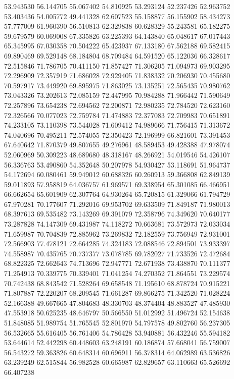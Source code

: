 53.943530
56.144705
55.067402
54.810925
53.293124
52.237426
52.963752
53.403436
54.005772
49.441328
62.607523
55.158877
56.155902
58.434273
57.777009
61.960390
56.510813
62.329838
60.628329
55.243581
65.182275
59.679579
60.069008
67.335826
63.225393
64.143840
65.048617
67.017443
65.345995
67.030358
70.504222
65.423937
67.133180
67.562188
69.582415
69.890469
69.529148
68.184804
68.709484
64.591520
65.122036
66.328617
72.515846
71.786705
70.411150
71.857427
71.306205
71.094973
69.903295
72.296909
72.357919
71.686028
72.929405
71.838332
70.206930
70.455680
70.597917
73.449920
69.895975
71.863025
73.135251
72.565435
70.980762
73.043326
73.202613
72.085159
72.447995
70.984288
71.966442
71.590649
72.257896
73.654238
72.694562
72.200871
72.980235
72.784520
72.623160
72.326566
70.077023
72.759784
71.474883
72.377083
72.709983
70.651891
74.233105
73.110398
73.544028
71.609412
74.989666
71.756415
71.313672
74.040696
70.495211
72.574055
72.350423
72.196999
66.821601
73.391453
67.640642
71.870379
49.807655
49.276961
48.589453
49.428388
47.978074
52.060969
50.309223
48.689680
48.318167
48.266921
54.019546
54.426107
56.336763
53.490860
54.352648
50.207978
54.930427
53.118691
51.964737
54.172694
60.080461
59.949012
60.688326
60.260913
59.366808
62.849139
59.011893
57.958819
64.036757
61.969571
69.338954
65.301085
66.466951
66.662654
65.601909
62.307764
64.930264
65.720815
61.329066
61.794729
67.970281
70.177607
71.292016
69.953702
69.633509
71.849187
71.980013
68.397613
69.535482
73.143269
69.391079
72.358796
74.349620
70.640177
73.287828
74.147309
69.431987
74.118272
70.663681
73.572973
72.033034
71.659987
70.704839
72.885962
73.269832
72.182559
73.756949
72.931001
72.566903
77.478121
72.664285
74.324183
72.088546
72.894501
73.933397
74.558987
70.435765
70.737377
73.078785
69.782027
71.733526
72.472684
68.822325
72.662643
74.713696
72.947771
72.671938
73.438870
70.111377
71.254913
70.339775
70.339401
71.041254
74.270352
71.864551
73.229574
70.742438
68.843542
71.528264
69.658548
71.195610
68.878724
70.915221
71.807887
72.220207
68.209545
71.661287
69.866275
71.342520
71.028224
52.166388
49.667665
47.804683
48.330703
48.374404
48.883527
47.485930
47.553918
50.625235
48.646797
50.566550
51.012992
51.496724
52.154638
51.848085
51.989754
51.765545
52.801970
54.797578
49.802760
56.237305
56.532665
55.616405
56.761406
54.786428
53.940881
56.432246
55.594182
53.644614
52.442298
60.448603
63.248191
60.186874
57.668041
56.759007
56.543272
59.363826
60.648314
60.696911
56.378314
64.062989
63.536826
63.239249
62.515844
56.982528
60.665987
62.829657
63.110663
65.526692
66.407238
